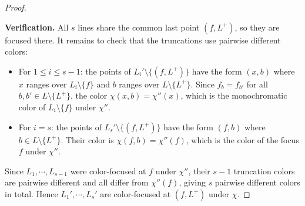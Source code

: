\documentclass[11pt, a4paper]{ctexrep}
\begin{document}
\begin{proof}
\begin{center}
    \end{center}

    \noindent\textbf{Verification.}
    All $s$ lines share the common last point $(f,L^+)$, so they are focused there. It remains to check that the truncations use pairwise different colors:
    \begin{itemize}
        \item For $1\leqslant i\leqslant s-1$: the points of $L_i'\setminus\{(f,L^+)\}$ have the form $(x,b)$ where $x$ ranges over $L_i\setminus\{f\}$ and $b$ ranges over $L\setminus\{L^+\}$. Since $f_b=f_{b'}$ for all $b,b'\in L\setminus\{L^+\}$, the color $\chi(x,b)=\chi''(x)$, which is the monochromatic color of $L_i\setminus\{f\}$ under $\chi''$.
        \item For $i=s$: the points of $L_s'\setminus\{(f,L^+)\}$ have the form $(f,b)$ where $b\in L\setminus\{L^+\}$. Their color is $\chi(f,b)=\chi''(f)$, which is the color of the focus $f$ under $\chi''$.
    \end{itemize}
    Since $L_1,\cdots,L_{s-1}$ were color-focused at $f$ under $\chi''$, their $s-1$ truncation colors are pairwise different and all differ from $\chi''(f)$, giving $s$ pairwise different colors in total. Hence $L_1',\cdots,L_s'$ are color-focused at $(f,L^+)$ under $\chi$.
\end{proof}
\end{document}
